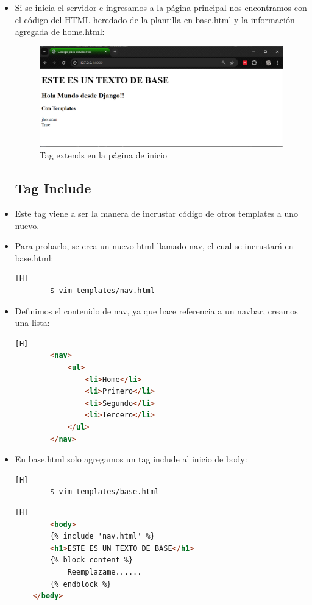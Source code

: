 \documentclass{article}
\begin{document}
\begin{itemize}
            \item Si se inicia el servidor e ingresamos a la página principal nos encontramos con el código del HTML heredado de la plantilla en base.html y la información agregada de home.html:
        \begin{figure}[H]
            \centering
            \includegraphics[width=0.7\linewidth]{img/Tag_extends.png}
            \caption{Tag extends en la página de inicio}
            \label{fig:enter-label}
        \end{figure}
        
        \subsection{Tag Include}
            \item Este tag viene a ser la manera de incrustar código de otros templates a uno nuevo.

            \item Para probarlo, se crea un nuevo html llamado nav, el cual se incrustará en base.html:
            
        \begin{lstlisting}[language=bash,caption={Creando la plantilla nav.html}][H]
        $ vim templates/nav.html
        \end{lstlisting}
            \item Definimos el contenido de nav, ya que hace referencia a un navbar, creamos una lista:
        \begin{lstlisting}[language=HTML,caption={Creando lista del navbar}][H]
        <nav>
            <ul>
                <li>Home</li>
                <li>Primero</li>
                <li>Segundo</li>
                <li>Tercero</li>
            </ul>
        </nav>
        \end{lstlisting}

        \item En base.html solo agregamos un tag include al inicio de body:
        \begin{lstlisting}[language=bash,caption={Ingresando a base.html}][H]
        $ vim templates/base.html
        \end{lstlisting}
        \begin{lstlisting}[language=HTML,caption={Incrustando el Tag include}][H]
        <body>
        {% include 'nav.html' %}
        <h1>ESTE ES UN TEXTO DE BASE</h1>
        {% block content %}
            Reemplazame......
        {% endblock %}
    </body>
        \end{lstlisting}


\end{itemize}
\end{document}
